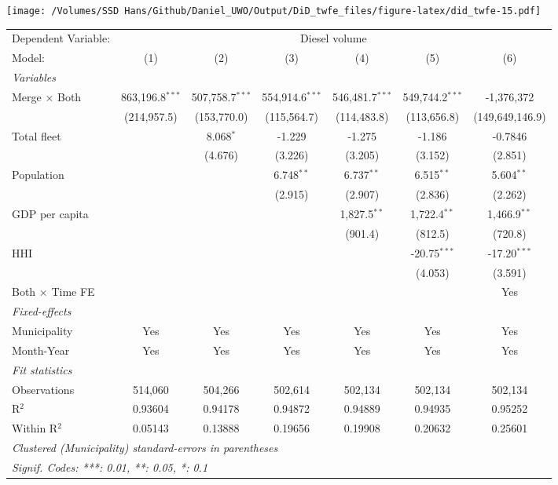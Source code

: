 \documentclass[
]{article}
\begin{document}
\texttt{[image: /Volumes/SSD Hans/Github/Daniel\_UWO/Output/DiD\_twfe\_files/figure-latex/did\_twfe-15.pdf]}

\begin{tabular}{lcccccc}
\tabularnewline\midrule\midrule
Dependent Variable:&\multicolumn{6}{c}{Diesel volume}\\
Model:&(1) & (2) & (3) & (4) & (5) & (6)\\
\midrule \emph{Variables}&   &   &   &   &   &  \\
Merge $\times $ Both & 863,196.8$^{***}$ & 507,758.7$^{***}$ & 554,914.6$^{***}$ & 546,481.7$^{***}$ & 549,744.2$^{***}$ & -1,376,372\\
  &(214,957.5) & (153,770.0) & (115,564.7) & (114,483.8) & (113,656.8) & (149,649,146.9)\\
Total fleet &    & 8.068$^{*}$ & -1.229 & -1.275 & -1.186 & -0.7846\\
  &   & (4.676) & (3.226) & (3.205) & (3.152) & (2.851)\\
Population &    &    & 6.748$^{**}$ & 6.737$^{**}$ & 6.515$^{**}$ & 5.604$^{**}$\\
  &   &    & (2.915) & (2.907) & (2.836) & (2.262)\\
GDP per capita &    &    &    & 1,827.5$^{**}$ & 1,722.4$^{**}$ & 1,466.9$^{**}$\\
  &   &    &    & (901.4) & (812.5) & (720.8)\\
HHI &    &    &    &    & -20.75$^{***}$ & -17.20$^{***}$\\
  &   &    &    &    & (4.053) & (3.591)\\
Both $\times$ Time FE &  &  &  &  &  & Yes\\
\midrule \emph{Fixed-effects}&   &   &   &   &   &  \\
Municipality & Yes & Yes & Yes & Yes & Yes & Yes\\
Month-Year & Yes & Yes & Yes & Yes & Yes & Yes\\
\midrule \emph{Fit statistics}&  & & & & & \\
Observations & 514,060&504,266&502,614&502,134&502,134&502,134\\
R$^2$ & 0.93604&0.94178&0.94872&0.94889&0.94935&0.95252\\
Within R$^2$ & 0.05143&0.13888&0.19656&0.19908&0.20632&0.25601\\
\midrule\midrule\multicolumn{7}{l}{\emph{Clustered (Municipality) standard-errors in parentheses}}\\
\multicolumn{7}{l}{\emph{Signif. Codes: ***: 0.01, **: 0.05, *: 0.1}}\\
\end{tabular}
\end{document}
